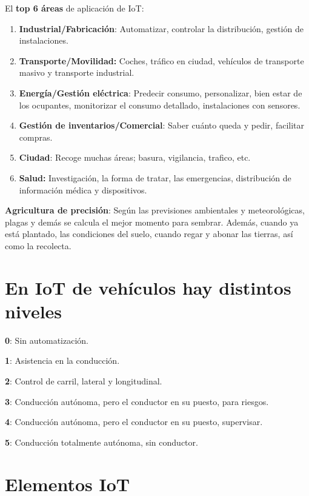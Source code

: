\documentclass[12pt]{report} %
\begin{document}
El \textbf{top 6 áreas} de aplicación de IoT:

\begin{enumerate}
\def\labelenumi{\arabic{enumi}.}

\item
  \textbf{Industrial/Fabricación}: Automatizar, controlar la
  distribución, gestión de instalaciones.
\item
  \textbf{Transporte/Movilidad:} Coches, tráfico en ciudad, vehículos de
  transporte masivo y transporte industrial.
\item
  \textbf{Energía/Gestión eléctrica}: Predecir consumo, personalizar,
  bien estar de los ocupantes, monitorizar el consumo detallado,
  instalaciones con sensores.
\item
  \textbf{Gestión de inventarios/Comercial}: Saber cuánto queda y pedir,
  facilitar compras.
\item
  \textbf{Ciudad}: Recoge muchas áreas; basura, vigilancia, trafico,
  etc.
\item
  \textbf{Salud:} Investigación, la forma de tratar, las emergencias,
  distribución de información médica y dispositivos.
\end{enumerate}

\textbf{Agricultura de precisión}: Según las previsiones ambientales y
meteorológicas, plagas y demás se calcula el mejor momento para sembrar.
Además, cuando ya está plantado, las condiciones del suelo, cuando regar
y abonar las tierras, así como la recolecta.

\newpage

\section{En IoT de vehículos hay distintos
niveles}

\textbf{0}: Sin automatización.

\textbf{1}: Asistencia en la conducción.

\textbf{2}: Control de carril, lateral y longitudinal.

\textbf{3}: Conducción autónoma, pero el conductor en su puesto, para
riesgos.

\textbf{4}: Conducción autónoma, pero el conductor en su puesto,
supervisar.

\textbf{5}: Conducción totalmente autónoma, sin conductor.

\section{Elementos IoT}
\end{document}
